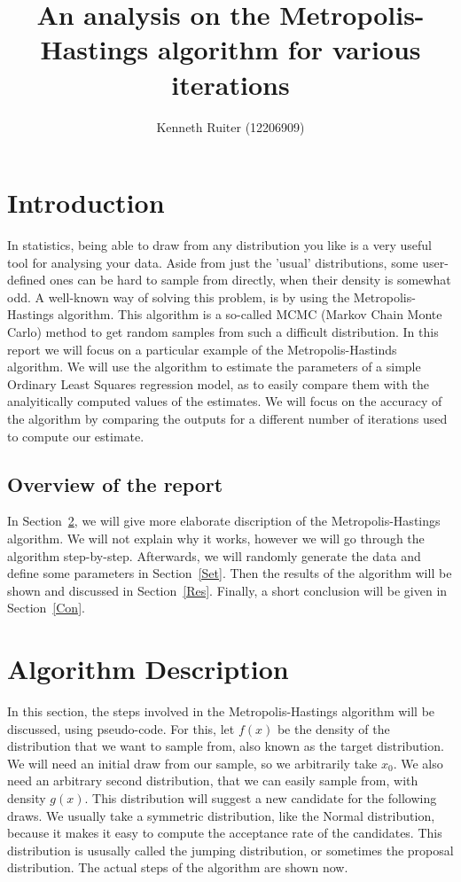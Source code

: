 \documentclass[a4paper,10pt]{article}\usepackage[]{graphicx}\usepackage[]{color}
\title{An analysis on the Metropolis-Hastings algorithm for various iterations}
\author{Kenneth Ruiter (12206909)}
\begin{document}


\maketitle
\newpage

\tableofcontents
\newpage

\section{Introduction}

In statistics, being able to draw from any distribution you like is a very useful tool for analysing your data. Aside from just the 'usual' distributions, some user-defined ones can be hard to sample from directly, when their density is somewhat odd. A well-known way of solving this problem, is by using the Metropolis-Hastings algorithm. This algorithm is a so-called MCMC (Markov Chain Monte Carlo) method to get random samples from such a difficult distribution. In this report we will focus on a particular example of the Metropolis-Hastinds algorithm. We will use the algorithm to estimate the parameters of a simple Ordinary Least Squares regression model, as to easily compare them with the analyitically computed values of the estimates. We will focus on the accuracy of the algorithm by comparing the outputs for a different number of iterations used to compute our estimate.

\subsection{Overview of the report}
In Section~\ref{AD}, we will give more elaborate discription of the Metropolis-Hastings algorithm. We will not explain why it works, however we will go through the algorithm step-by-step. Afterwards, we will randomly generate the data and define some parameters in Section~\ref{Set}. Then the results of the algorithm will be shown and discussed in Section~\ref{Res}. Finally, a short conclusion will be given in Section~\ref{Con}.

\newpage
\section{Algorithm Description}\label{AD}

In this section, the steps involved in the Metropolis-Hastings algorithm will be discussed, using pseudo-code. For this, let $f(x)$ be the density of the distribution that we want to sample from, also known as the target distribution. We will need an initial draw from our sample, so we arbitrarily take $x_0$. We also need an arbitrary second distribution, that we can easily sample from, with density $g(x)$. This distribution will suggest a new candidate for the following draws. We usually take a symmetric distribution, like the Normal distribution, because it makes it easy to compute the acceptance rate of the candidates. This distribution is ususally called the jumping distribution, or sometimes the proposal distribution. The actual steps of the algorithm are shown now.
\end{document}
